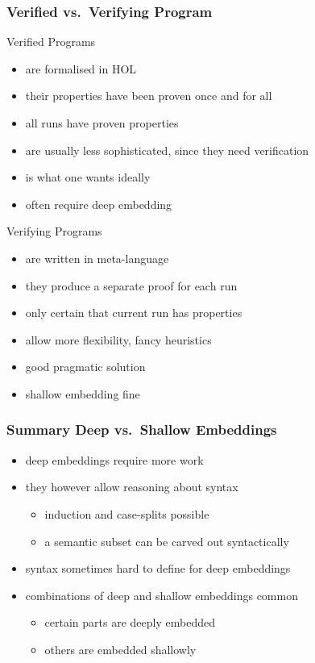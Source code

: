 \begin{frame}
\frametitle{Verified vs.\ Verifying Program}
\newcommand{\dummyitem}{\item[] \leavevmode\phantom{gg}}

\begin{minipage}[t]{.46\textwidth}
\begin{block}{Verified Programs}
\begin{itemize}
\item are formalised in HOL
\item their properties have been proven once and for all
\item all runs have proven properties
\item are usually less sophisticated, since they need verification
\item is what one wants ideally
\item often require deep embedding
\end{itemize}
\end{block}
\end{minipage}\qquad
\begin{minipage}[t]{.46\textwidth}
\begin{block}{Verifying Programs}
\begin{itemize}
\item are written in meta-language
\item they produce a separate proof for each run
\item only certain that current run has properties
\item allow more flexibility, \eg fancy heuristics
\item good pragmatic solution
\item shallow embedding fine
\end{itemize}
\end{block}
\end{minipage}
\end{frame}


\begin{frame}
\frametitle{Summary Deep vs.\ Shallow Embeddings}
\begin{itemize}
\item deep embeddings require more work
\item they however allow reasoning about syntax
\begin{itemize}
\item induction and case-splits possible
\item a semantic subset can be carved out syntactically
\end{itemize}
\item syntax sometimes hard to define for deep embeddings
\item combinations of deep and shallow embeddings common
\begin{itemize}
\item certain parts are deeply embedded
\item others are embedded shallowly
\end{itemize}
\end{itemize}
\end{frame}



